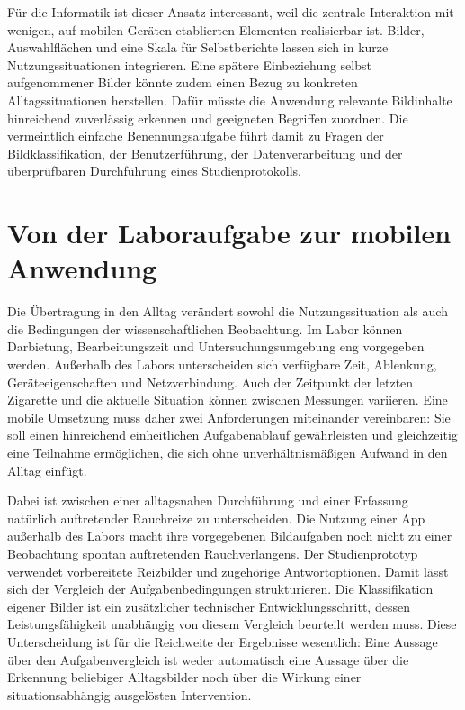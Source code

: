 Für die Informatik ist dieser Ansatz interessant, weil die zentrale Interaktion mit wenigen, auf mobilen Geräten etablierten Elementen realisierbar ist. Bilder, Auswahlflächen und eine Skala für Selbstberichte lassen sich in kurze Nutzungssituationen integrieren. Eine spätere Einbeziehung selbst aufgenommener Bilder könnte zudem einen Bezug zu konkreten Alltagssituationen herstellen. Dafür müsste die Anwendung relevante Bildinhalte hinreichend zuverlässig erkennen und geeigneten Begriffen zuordnen. Die vermeintlich einfache Benennungsaufgabe führt damit zu Fragen der Bildklassifikation, der Benutzerführung, der Datenverarbeitung und der überprüfbaren Durchführung eines Studienprotokolls.

\section*{Von der Laboraufgabe zur mobilen Anwendung}

Die Übertragung in den Alltag verändert sowohl die Nutzungssituation als auch die Bedingungen der wissenschaftlichen Beobachtung. Im Labor können Darbietung, Bearbeitungszeit und Untersuchungsumgebung eng vorgegeben werden. Außerhalb des Labors unterscheiden sich verfügbare Zeit, Ablenkung, Geräteeigenschaften und Netzverbindung. Auch der Zeitpunkt der letzten Zigarette und die aktuelle Situation können zwischen Messungen variieren. Eine mobile Umsetzung muss daher zwei Anforderungen miteinander vereinbaren: Sie soll einen hinreichend einheitlichen Aufgabenablauf gewährleisten und gleichzeitig eine Teilnahme ermöglichen, die sich ohne unverhältnismäßigen Aufwand in den Alltag einfügt.

Dabei ist zwischen einer alltagsnahen Durchführung und einer Erfassung natürlich auftretender Rauchreize zu unterscheiden. Die Nutzung einer App außerhalb des Labors macht ihre vorgegebenen Bildaufgaben noch nicht zu einer Beobachtung spontan auftretenden Rauchverlangens. Der Studienprototyp verwendet vorbereitete Reizbilder und zugehörige Antwortoptionen. Damit lässt sich der Vergleich der Aufgabenbedingungen strukturieren. Die Klassifikation eigener Bilder ist ein zusätzlicher technischer Entwicklungsschritt, dessen Leistungsfähigkeit unabhängig von diesem Vergleich beurteilt werden muss. Diese Unterscheidung ist für die Reichweite der Ergebnisse wesentlich: Eine Aussage über den Aufgabenvergleich ist weder automatisch eine Aussage über die Erkennung beliebiger Alltagsbilder noch über die Wirkung einer situationsabhängig ausgelösten Intervention.

